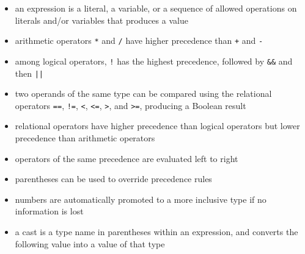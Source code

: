 \documentclass[8pt,a4paper,compress]{beamer}
\begin{document}
\begin{frame}[fragile]
\begin{itemize}
\item an expression is a literal, a variable, or a sequence of allowed operations on literals and/or variables that produces a value

\item arithmetic operators \lstinline{*} and \lstinline{/} have higher precedence than \lstinline{+} and \lstinline{-}

\item among logical operators, \lstinline{!} has the highest precedence, followed by \lstinline{&&} and then \lstinline{||}

\item two operands of the same type can be compared using the relational operators \lstinline{==}, \lstinline{!=}, \lstinline{<}, \lstinline{<=}, \lstinline{>}, and \lstinline{>=}, producing a Boolean result

\item relational operators have higher precedence than logical operators but lower precedence than arithmetic operators

\item operators of the same precedence are evaluated left to right

\item parentheses can be used to override precedence rules

\item numbers are automatically promoted to a more inclusive type if no information is lost

\item a cast is a type name in parentheses within an expression, and converts the following value into a value of that type
\end{itemize}
\end{frame}
\end{document}
